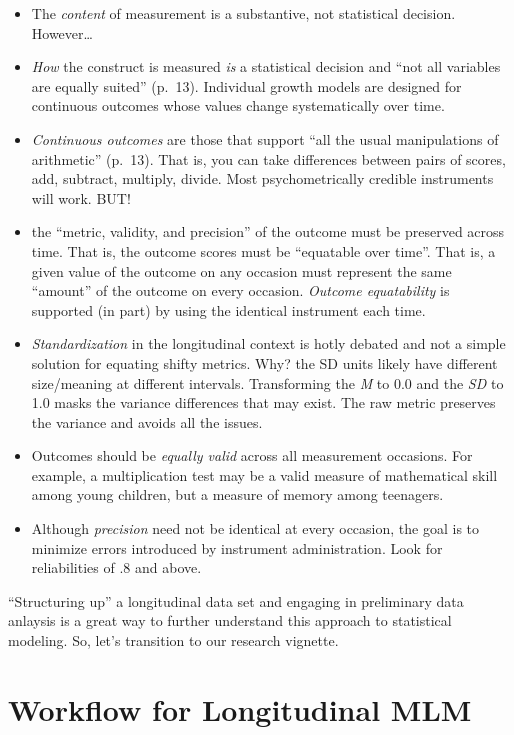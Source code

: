 \documentclass[
  english,
]{book}
\providecommand{\tightlist}{%
  \setlength{\itemsep}{0pt}\setlength{\parskip}{0pt}}
\begin{document}
\begin{enumerate}
  \begin{itemize}
  \tightlist
  \item
    The \emph{content} of measurement is a substantive, not statistical decision. However\ldots{}
  \item
    \emph{How} the construct is measured \emph{is} a statistical decision and ``not all variables are equally suited'' (p.~13). Individual growth models are designed for continuous outcomes whose values change systematically over time.
  \item
    \emph{Continuous outcomes} are those that support ``all the usual manipulations of arithmetic'' (p.~13). That is, you can take differences between pairs of scores, add, subtract, multiply, divide. Most psychometrically credible instruments will work. BUT!
  \item
    the ``metric, validity, and precision'' of the outcome must be preserved across time. That is, the outcome scores must be ``equatable over time''. That is, a given value of the outcome on any occasion must represent the same ``amount'' of the outcome on every occasion. \emph{Outcome equatability} is supported (in part) by using the identical instrument each time.
  \item
    \emph{Standardization} in the longitudinal context is hotly debated and not a simple solution for equating shifty metrics. Why? the SD units likely have different size/meaning at different intervals. Transforming the \emph{M} to 0.0 and the \emph{SD} to 1.0 masks the variance differences that may exist. The raw metric preserves the variance and avoids all the issues.
  \item
    Outcomes should be \emph{equally valid} across all measurement occasions. For example, a multiplication test may be a valid measure of mathematical skill among young children, but a measure of memory among teenagers.
  \item
    Although \emph{precision} need not be identical at every occasion, the goal is to minimize errors introduced by instrument administration. Look for reliabilities of .8 and above.
  \end{itemize}
\end{enumerate}

``Structuring up'' a longitudinal data set and engaging in preliminary data anlaysis is a great way to further understand this approach to statistical modeling. So, let's transition to our research vignette.

\hypertarget{workflow-for-longitudinal-mlm}{%
\section{Workflow for Longitudinal MLM}\label{workflow-for-longitudinal-mlm}}
\end{document}
